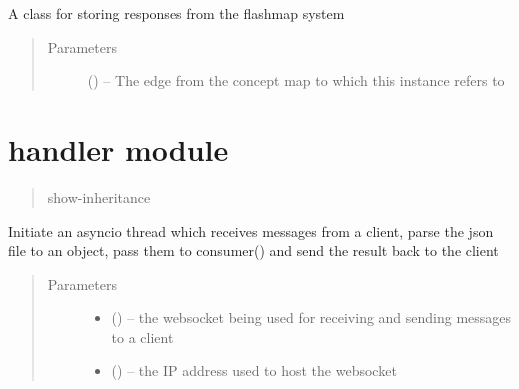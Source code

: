 \documentclass[letterpaper,10pt,english]{sphinxmanual}
\begin{document}
\begin{fulllineitems}
\label{\detokenize{flashmap_instance:flashmap_instance.FlashmapInstance}}
A class for storing responses from the flashmap system
\begin{quote}\begin{description}
\item[{Parameters}] \leavevmode
{} ({\hyperref[\detokenize{edge:edge.Edge}]{}}) -- The edge from the concept map to which this instance refers to

\end{description}\end{quote}

\end{fulllineitems}



\chapter{handler module}
\label{\detokenize{handler:handler-module}}\label{\detokenize{handler:module-handler}}\label{\detokenize{handler::doc}}\begin{quote}\begin{description}
\item[{show-inheritance}] \leavevmode
\end{description}\end{quote}

\begin{fulllineitems}
\label{\detokenize{handler:handler.handler}}
Initiate an asyncio thread which receives messages from a client, parse the json file to an object, pass them to consumer() and send the result back to the client
\begin{quote}\begin{description}
\item[{Parameters}] \leavevmode\begin{itemize}
\item {} 
 () -- the websocket being used for receiving and sending messages to a client

\item {} 
 () -- the IP address used to host the websocket

\end{itemize}

\end{description}\end{quote}

\end{fulllineitems}
\end{document}
